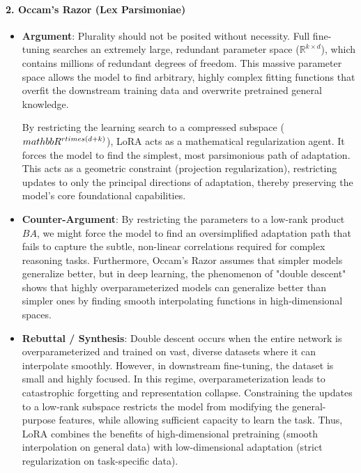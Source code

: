 \paragraph{2. Occam's Razor (Lex Parsimoniae)}
\begin{itemize}
  \item \textbf{Argument}: Plurality should not be posited without necessity. Full fine-tuning searches an extremely large, redundant parameter space ($\mathbb{R}^{k \times d}$), which contains millions of redundant degrees of freedom. This massive parameter space allows the model to find arbitrary, highly complex fitting functions that overfit the downstream training data and overwrite pretrained general knowledge.
  
  By restricting the learning search to a compressed subspace ($\\mathbb{R}^{r \\times (d+k)}$), LoRA acts as a mathematical regularization agent. It forces the model to find the simplest, most parsimonious path of adaptation. This acts as a geometric constraint (projection regularization), restricting updates to only the principal directions of adaptation, thereby preserving the model's core foundational capabilities.
  
  \item \textbf{Counter-Argument}: By restricting the parameters to a low-rank product $BA$, we might force the model to find an oversimplified adaptation path that fails to capture the subtle, non-linear correlations required for complex reasoning tasks. Furthermore, Occam's Razor assumes that simpler models generalize better, but in deep learning, the phenomenon of "double descent" shows that highly overparameterized models can generalize better than simpler ones by finding smooth interpolating functions in high-dimensional spaces.
  
  \item \textbf{Rebuttal / Synthesis}: Double descent occurs when the entire network is overparameterized and trained on vast, diverse datasets where it can interpolate smoothly. However, in downstream fine-tuning, the dataset is small and highly focused. In this regime, overparameterization leads to catastrophic forgetting and representation collapse. Constraining the updates to a low-rank subspace restricts the model from modifying the general-purpose features, while allowing sufficient capacity to learn the task. Thus, LoRA combines the benefits of high-dimensional pretraining (smooth interpolation on general data) with low-dimensional adaptation (strict regularization on task-specific data).
\end{itemize}

